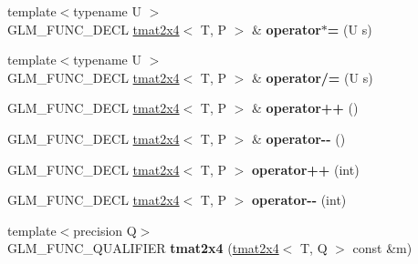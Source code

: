 \begin{DoxyCompactItemize}
\item 
\hypertarget{structglm_1_1detail_1_1tmat2x4_af29fd96e82abe8f85ac318865d365755}{{\footnotesize template$<$typename U $>$ }\\G\-L\-M\-\_\-\-F\-U\-N\-C\-\_\-\-D\-E\-C\-L \hyperlink{structglm_1_1detail_1_1tmat2x4}{tmat2x4}$<$ T, P $>$ \& {\bfseries operator$\ast$=} (U s)}\label{structglm_1_1detail_1_1tmat2x4_af29fd96e82abe8f85ac318865d365755}

\item 
\hypertarget{structglm_1_1detail_1_1tmat2x4_a02241268cd53f9e9eee1a0e3deae6856}{{\footnotesize template$<$typename U $>$ }\\G\-L\-M\-\_\-\-F\-U\-N\-C\-\_\-\-D\-E\-C\-L \hyperlink{structglm_1_1detail_1_1tmat2x4}{tmat2x4}$<$ T, P $>$ \& {\bfseries operator/=} (U s)}\label{structglm_1_1detail_1_1tmat2x4_a02241268cd53f9e9eee1a0e3deae6856}

\item 
\hypertarget{structglm_1_1detail_1_1tmat2x4_ae3a31564490142cb6f43c1abb753b028}{G\-L\-M\-\_\-\-F\-U\-N\-C\-\_\-\-D\-E\-C\-L \hyperlink{structglm_1_1detail_1_1tmat2x4}{tmat2x4}$<$ T, P $>$ \& {\bfseries operator++} ()}\label{structglm_1_1detail_1_1tmat2x4_ae3a31564490142cb6f43c1abb753b028}

\item 
\hypertarget{structglm_1_1detail_1_1tmat2x4_a556fd133fa224ffb3d2ebf13d727d820}{G\-L\-M\-\_\-\-F\-U\-N\-C\-\_\-\-D\-E\-C\-L \hyperlink{structglm_1_1detail_1_1tmat2x4}{tmat2x4}$<$ T, P $>$ \& {\bfseries operator-\/-\/} ()}\label{structglm_1_1detail_1_1tmat2x4_a556fd133fa224ffb3d2ebf13d727d820}

\item 
\hypertarget{structglm_1_1detail_1_1tmat2x4_a8917eda810b07dcf0a5e65e828724505}{G\-L\-M\-\_\-\-F\-U\-N\-C\-\_\-\-D\-E\-C\-L \hyperlink{structglm_1_1detail_1_1tmat2x4}{tmat2x4}$<$ T, P $>$ {\bfseries operator++} (int)}\label{structglm_1_1detail_1_1tmat2x4_a8917eda810b07dcf0a5e65e828724505}

\item 
\hypertarget{structglm_1_1detail_1_1tmat2x4_a6cde4bc7178ddd37a9f8125f9f350ba0}{G\-L\-M\-\_\-\-F\-U\-N\-C\-\_\-\-D\-E\-C\-L \hyperlink{structglm_1_1detail_1_1tmat2x4}{tmat2x4}$<$ T, P $>$ {\bfseries operator-\/-\/} (int)}\label{structglm_1_1detail_1_1tmat2x4_a6cde4bc7178ddd37a9f8125f9f350ba0}

\item 
\hypertarget{structglm_1_1detail_1_1tmat2x4_ac1a53a7910b8085b462f623c70252f10}{{\footnotesize template$<$precision Q$>$ }\\G\-L\-M\-\_\-\-F\-U\-N\-C\-\_\-\-Q\-U\-A\-L\-I\-F\-I\-E\-R {\bfseries tmat2x4} (\hyperlink{structglm_1_1detail_1_1tmat2x4}{tmat2x4}$<$ T, Q $>$ const \&m)}\label{structglm_1_1detail_1_1tmat2x4_ac1a53a7910b8085b462f623c70252f10}


\end{DoxyCompactItemize}
